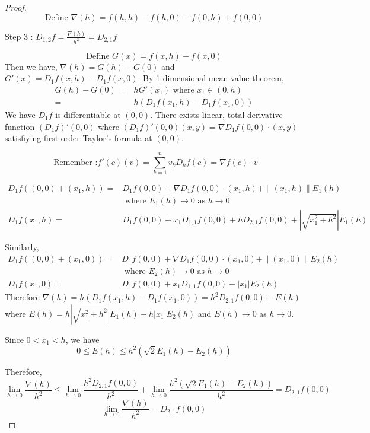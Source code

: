 \begin{proof}
	\begin{equation}
		\text{Define }\nabla(h) = f(h,h)-f(h,0)-f(0,h)+f(0,0)
	\end{equation}
\begin{commentary}Step 3 : $D_{1,2} f = \frac{\nabla(h)}{h^2} = D_{2,1} f$\end{commentary}
\begin{equation}
	\text{Define }G(x) = f(x,h)-f(x,0)
\end{equation}
Then  we have, $\nabla(h) = G(h)-G(0)$ and $G'(x) = D_1f(x,h) - D_1f(x,0)$.
By 1-dimensional mean value theorem,
\begin{align*}
	G(h)-G(0) = & hG'(x_1)  \text{ where } x_1 \in (0,h) \\
	= & h\left( D_1f(x_1,h)-D_1f(x_1,0)\right)
\end{align*}
We have $D_1 f$ is differentiable at $(0,0)$.
There exists linear, total derivative function $(D_1f)'(0,0)$ where $(D_1f)'(0,0)(x,y) = \nabla D_1 f(0,0) \cdot{} (x,y)$ satisfiying first-order Taylor's formula at $(0,0)$. 
\begin{commentary}
\[ \text{ Remember :} f'(\bar{c})(\bar{v}) = \sum_{k = 1}^n v_k D_k f(\bar{c}) = \nabla f(\bar{c}) \cdot{} \bar{v} \]
\end{commentary}
\begin{align*}
	D_1 f((0,0) + (x_1,h)) = & D_1 f(0,0) + \nabla D_1 f(0,0) \cdot{} (x_1,h) + \|(x_1,h)\| E_1(h) \\
	& \text{ where } E_1(h) \to 0 \text{ as } h \to 0\\
	D_1 f(x_1,h) = & D_1 f(0,0) + x_1 D_{1,1} f(0,0) + h D_{2,1} f(0,0) + \left|\sqrt{x_1^2+h^2}\right| E_1(h)
\end{align*}

	Similarly,
\begin{align*}
	D_1 f((0,0) + (x_1,0)) = & D_1 f(0,0) + \nabla D_1 f(0,0) \cdot{} (x_1,0) + \|(x_1,0)\| E_2(h) \\
	& \text{ where } E_2(h) \to 0 \text{ as } h  \to 0 \\
	D_1 f(x_1,0) = & D_1 f(0,0) + x_1 D_{1,1} f(0,0) + |x_1| E_2(h)
\end{align*}
	Therefore $\nabla(h) = h (D_1 f(x_1,h) - D_1 f(x_1,0)) = h^2 D_{2,1} f(0,0) + E(h)$ where $E(h) = h|\sqrt{x_1^2+h^2}| E_1(h) - h|x_1|E_2(h)$ and $E(h) \to 0$ as $h \to 0$.

	Since $0 < x_1 < h$, we have
	\[ 0 \le E(h) \le h^2\left(\sqrt{2}E_1(h)-E_2(h)\right) \]

Therefore,
	\[ \lim_{h \to 0} \frac{\nabla(h)}{h^2} \le \lim_{h \to 0} \frac{h^2 D_{2,1} f(0,0)}{h^2} + \lim_{h \to 0} \frac{h^2 (\sqrt{2}E_1(h) - E_2(h))}{h^2} = D_{2,1}f(0,0) \]
\begin{equation}
\lim_{h \to 0} \frac{\nabla(h)}{h^2} = D_{2,1} f(0,0)
\end{equation}


\end{proof}
